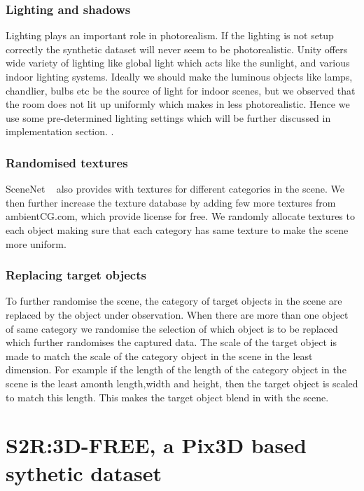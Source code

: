 \subsubsection{Lighting and shadows}
Lighting plays an important role in photorealism. If the lighting is not setup correctly the synthetic dataset will never seem to be photorealistic.
Unity offers wide variety of lighting like global light which acts like the sunlight, and various indoor lighting systems.
Ideally we should make the luminous objects like lamps, chandlier, bulbs etc be the source of light for indoor scenes, but we observed that the room does not lit up uniformly which makes in less photorealistic.
Hence we use some pre-determined lighting settings which will be further discussed in implementation section. .

\subsubsection{Randomised textures}
SceneNet ~\cite{McCormac:etal:ICCV2017} also provides with textures for different categories in the scene.
We then further increase the texture database by adding few more textures from ambientCG.com, which provide license for free.
We randomly allocate textures to each object making sure that each category has same texture to make the scene more uniform.

\subsubsection{Replacing target objects}
To further randomise the scene, the category of target objects in the scene are replaced by the object under observation.
When there are more than one object of same category we randomise the selection of which object is to be replaced which further randomises the captured data.
The scale of the target object is made to match the scale of the category object in the scene in the least dimension.
For example if the length of the length of the category object in the scene is the least amonth length,width and height, then the target object is scaled to match this length.
This makes the target object blend in with the scene.

\section{S2R:3D-FREE, a Pix3D based sythetic dataset}

